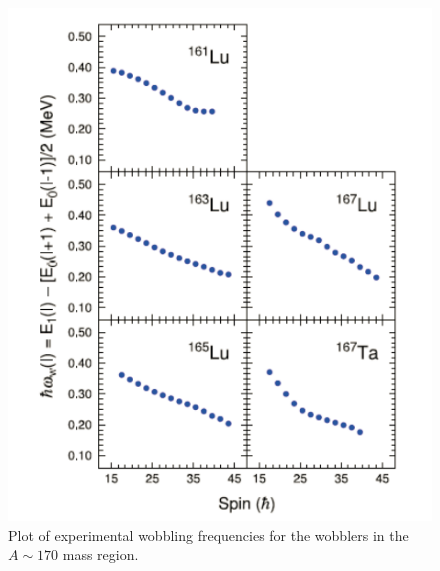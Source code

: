 \begin{figure}[t!]
\centerline{\includegraphics[height=0.3\textheight]{./img/c1/Wobbling_frequencies.png}}
	\caption{Plot of experimental wobbling frequencies for the wobblers in the $A\sim{}170$ mass region.\label{fig:chp1-wobbling-freq}}
\end{figure}

